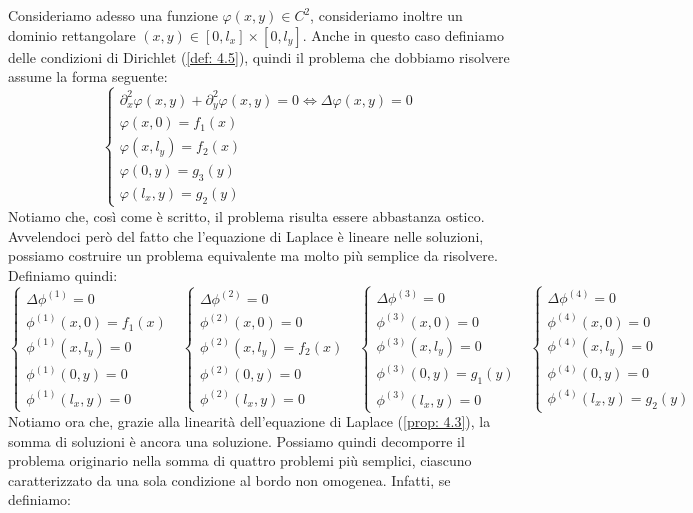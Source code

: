 \documentclass[a4paper,12pt]{report}
\begin{document}
Consideriamo adesso una funzione $\varphi(x,y)\in C^2$, consideriamo inoltre un dominio rettangolare $(x,y)\in [0,l_x]\times[0,l_y]$. Anche in questo caso definiamo delle condizioni di Dirichlet (\ref{def: 4.5}), quindi il problema che dobbiamo risolvere assume la forma seguente:
\[\begin{cases}
    \partial_x^2\varphi(x,y)+\partial_y^2\varphi(x,y)=0\iff \Delta\varphi(x,y)=0
    \\\varphi(x,0)=f_1(x)
    \\\varphi(x,l_y)=f_2(x)
    \\\varphi(0,y)=g_3(y)
    \\\varphi(l_x,y)=g_2(y)
\end{cases}\]
Notiamo che, così come è scritto, il problema risulta essere abbastanza ostico. Avvelendoci però del fatto che l'equazione di Laplace è lineare nelle soluzioni, possiamo costruire un problema equivalente ma molto più semplice da risolvere. Definiamo quindi:
\[\begin{cases}
    \Delta\phi^{(1)}=0
    \\\phi^{(1)}(x,0)=f_1(x)
    \\\phi^{(1)}(x,l_y)=0
    \\\phi^{(1)}(0,y)=0
    \\\phi^{(1)}(l_x,y)=0
\end{cases}\ \  \ \begin{cases}
    \Delta\phi^{(2)}=0
    \\\phi^{(2)}(x,0)=0
    \\\phi^{(2)}(x,l_y)=f_2(x)
    \\\phi^{(2)}(0,y)=0
    \\\phi^{(2)}(l_x,y)=0
\end{cases}\ \ \ \begin{cases}
    \Delta\phi^{(3)}=0
    \\\phi^{(3)}(x,0)=0
    \\\phi^{(3)}(x,l_y)=0
    \\\phi^{(3)}(0,y)=g_1(y)
    \\\phi^{(3)}(l_x,y)=0
\end{cases}\ \ \ \begin{cases}
    \Delta\phi^{(4)}=0
    \\\phi^{(4)}(x,0)=0
    \\\phi^{(4)}(x,l_y)=0
    \\\phi^{(4)}(0,y)=0
    \\\phi^{(4)}(l_x,y)=g_2(y)
\end{cases}\]
Notiamo ora che, grazie alla linearità dell’equazione di Laplace (\ref{prop: 4.3}), la somma di soluzioni è ancora una soluzione. Possiamo quindi decomporre il problema originario nella somma di quattro problemi più semplici, ciascuno caratterizzato da una sola condizione al bordo non omogenea. Infatti, se definiamo:
\end{document}
